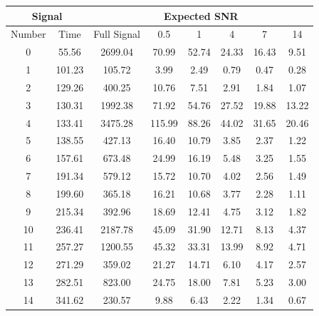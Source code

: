 \begin{tabular}{|cc|c|ccccc|}
\hline
\multicolumn{2}{|c|}{Signal}& \multicolumn{6}{c|}{Expected SNR} \\
\hline
Number & Time  & Full Signal & 0.5 & 1 & 4 & 7 & 14 \\
\hline
0 & 55.56 & 2699.04 & 70.99 & 52.74 & 24.33 & 16.43 & 9.51 \\
1 & 101.23 & 105.72 & 3.99 & 2.49 & 0.79 & 0.47 & 0.28 \\
2 & 129.26 & 400.25 & 10.76 & 7.51 & 2.91 & 1.84 & 1.07 \\
3 & 130.31 & 1992.38 & 71.92 & 54.76 & 27.52 & 19.88 & 13.22 \\
4 & 133.41 & 3475.28 & 115.99 & 88.26 & 44.02 & 31.65 & 20.46 \\
5 & 138.55 & 427.13 & 16.40 & 10.79 & 3.85 & 2.37 & 1.22 \\
6 & 157.61 & 673.48 & 24.99 & 16.19 & 5.48 & 3.25 & 1.55 \\
7 & 191.34 & 579.12 & 15.72 & 10.70 & 4.02 & 2.56 & 1.49 \\
8 & 199.60 & 365.18 & 16.21 & 10.68 & 3.77 & 2.28 & 1.11 \\
9 & 215.34 & 392.96 & 18.69 & 12.41 & 4.75 & 3.12 & 1.82 \\
10 & 236.41 & 2187.78 & 45.09 & 31.90 & 12.71 & 8.13 & 4.37 \\
11 & 257.27 & 1200.55 & 45.32 & 33.31 & 13.99 & 8.92 & 4.71 \\
12 & 271.29 & 359.02 & 21.27 & 14.71 & 6.10 & 4.17 & 2.57 \\
13 & 282.51 & 823.00 & 24.75 & 18.00 & 7.81 & 5.23 & 3.00 \\
14 & 341.62 & 230.57 & 9.88 & 6.43 & 2.22 & 1.34 & 0.67 \\
\hline
\end{tabular}

